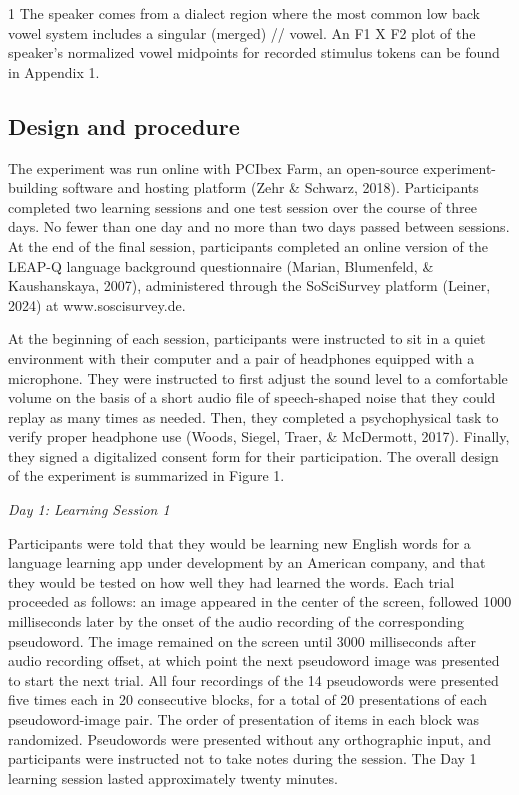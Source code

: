 \documentclass[
  english,
  man,floatsintext]{apa7}
\begin{document}
1 The speaker comes from a dialect region where the most common low back vowel system includes a singular (merged) /\textscripta/ vowel. An F1 X F2 plot of the speaker's normalized vowel midpoints for recorded stimulus tokens can be found in Appendix 1.

\subsection{Design and procedure}\label{design-and-procedure}

The experiment was run online with PCIbex Farm, an open-source experiment-building software and hosting platform (Zehr \& Schwarz, 2018). Participants completed two learning sessions and one test session over the course of three days. No fewer than one day and no more than two days passed between sessions. At the end of the final session, participants completed an online version of the LEAP-Q language background questionnaire (Marian, Blumenfeld, \& Kaushanskaya, 2007), administered through the SoSciSurvey platform (Leiner, 2024) at www.soscisurvey.de.

At the beginning of each session, participants were instructed to sit in a quiet environment with their computer and a pair of headphones equipped with a microphone. They were instructed to first adjust the sound level to a comfortable volume on the basis of a short audio file of speech-shaped noise that they could replay as many times as needed. Then, they completed a psychophysical task to verify proper headphone use (Woods, Siegel, Traer, \& McDermott, 2017). Finally, they signed a digitalized consent form for their participation. The overall design of the experiment is summarized in Figure 1.

\emph{Day 1: Learning Session 1}

Participants were told that they would be learning new English words for a language learning app under development by an American company, and that they would be tested on how well they had learned the words. Each trial proceeded as follows: an image appeared in the center of the screen, followed 1000 milliseconds later by the onset of the audio recording of the corresponding pseudoword. The image remained on the screen until 3000 milliseconds after audio recording offset, at which point the next pseudoword image was presented to start the next trial. All four recordings of the 14 pseudowords were presented five times each in 20 consecutive blocks, for a total of 20 presentations of each pseudoword-image pair. The order of presentation of items in each block was randomized. Pseudowords were presented without any orthographic input, and participants were instructed not to take notes during the session. The Day 1 learning session lasted approximately twenty minutes.
\end{document}
